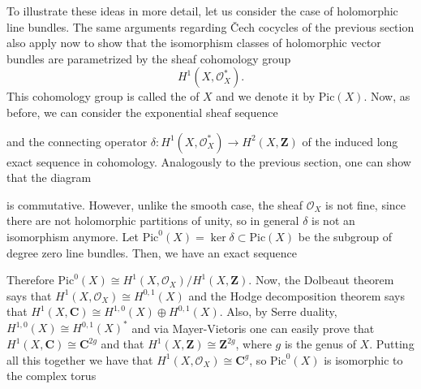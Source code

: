 \documentclass[12pt,a4paper]{book}
\theoremstyle{definition} \newtheorem{defn}[thm]{Definition}
\theoremstyle{definition} \newtheorem{ejemplo}[thm]{Example}
\theoremstyle{remark} \newtheorem*{rem}{Remark}
\def\OO{\mathscr{O}}
\def\CC{\mathbf{C}}
\def\ZZ{\mathbf{Z}}
\def\Pic{\mathrm{Pic}}
\let\emph\relax
\begin{document}
       To illustrate these ideas in more detail, let us consider the case of holomorphic line bundles. The same arguments regarding \v{C}ech cocycles of the previous section also apply now to show that the isomorphism classes of holomorphic vector bundles are parametrized by the sheaf cohomology group
       \begin{equation*}
	 H^1(X,\OO_X^*).
       \end{equation*}
       This cohomology group is called the \emph{Picard group} of $X$ and we denote it by $\Pic(X)$.
       Now, as before, we can consider the exponential sheaf sequence
      \begin{center}
       \end{center}
       and the connecting operator $\delta:H^1(X,\OO_X^*)\rightarrow H^2(X,\ZZ)$ of the induced long exact sequence in cohomology. Analogously to the previous section, one can show that the diagram 
      \begin{center}
       \end{center}
       is commutative. However, unlike the smooth case, the sheaf $\OO_X$ is not fine, since there are not holomorphic partitions of unity, so in general $\delta$ is not an isomorphism anymore. Let $\Pic^0(X)=\ker \delta \subset \Pic(X)$ be the subgroup of degree zero line bundles. Then, we have an exact sequence
      \begin{center}
       \end{center}
       Therefore $\Pic^0(X)\cong H^1(X,\OO_X)/H^1(X,\ZZ)$. Now, the Dolbeaut theorem says that $H^1(X,\OO_X)\cong H^{0,1}(X)$ and the Hodge decomposition theorem says that $H^1(X,\CC)\cong H^{1,0}(X) \oplus H^{0,1}(X)$. Also, by Serre duality, $H^{1,0}(X)\cong H^{0,1}(X)^*$ and via Mayer-Vietoris one can easily prove that $H^1(X,\CC)\cong\CC^{2g}$ and that $H^1(X,\ZZ)\cong\ZZ^{2g}$, where $g$ is the genus of $X$. Putting all this together we have that $H^1(X,\OO_X)\cong \CC^{g}$, so $\Pic^0(X)$ is isomorphic to the complex torus
\end{document}
